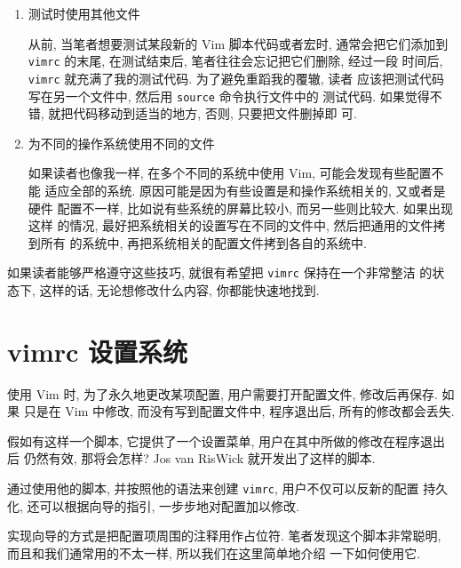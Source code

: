 \begin{enumerate}
    \item 测试时使用其他文件

    从前, 当笔者想要测试某段新的 Vim 脚本代码或者宏时, 通常会把它们添加到
    \texttt{vimrc} 的末尾, 在测试结束后, 笔者往往会忘记把它们删除, 经过一段
    时间后, \texttt{vimrc} 就充满了我的测试代码. 为了避免重蹈我的覆辙, 读者
    应该把测试代码写在另一个文件中, 然后用 \texttt{source} 命令执行文件中的
    测试代码. 如果觉得不错, 就把代码移动到适当的地方, 否则, 只要把文件删掉即
    可.

	\item 为不同的操作系统使用不同的文件

	如果读者也像我一样, 在多个不同的系统中使用 Vim, 可能会发现有些配置不能
	适应全部的系统. 原因可能是因为有些设置是和操作系统相关的, 又或者是硬件
	配置不一样, 比如说有些系统的屏幕比较小, 而另一些则比较大. 如果出现这样
	的情况, 最好把系统相关的设置写在不同的文件中, 然后把通用的文件拷到所有
	的系统中, 再把系统相关的配置文件拷到各自的系统中.
\end{enumerate}

如果读者能够严格遵守这些技巧, 就很有希望把 \texttt{vimrc} 保持在一个非常整洁
的状态下, 这样的话, 无论想修改什么内容, 你都能快速地找到.

\section{vimrc 设置系统}
\label{sec:a_vimrc_setup_system}

使用 Vim 时, 为了永久地更改某项配置, 用户需要打开配置文件, 修改后再保存. 如果
只是在 Vim 中修改, 而没有写到配置文件中, 程序退出后, 所有的修改都会丢失.

假如有这样一个脚本, 它提供了一个设置菜单, 用户在其中所做的修改在程序退出后
仍然有效, 那将会怎样? Jos van RisWick 就开发出了这样的脚本.

通过使用他的脚本, 并按照他的语法来创建 \texttt{vimrc}, 用户不仅可以反新的配置
持久化, 还可以根据向导的指引, 一步步地对配置加以修改.

实现向导的方式是把配置项周围的注释用作占位符.
笔者发现这个脚本非常聪明, 而且和我们通常用的不太一样, 所以我们在这里简单地介绍
一下如何使用它.
